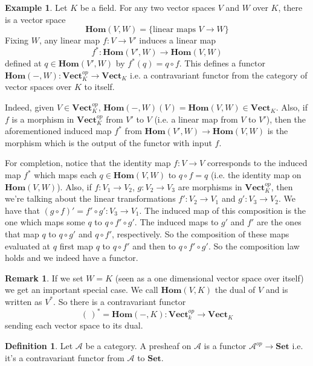 \documentclass{article}
\theoremstyle{definition}
\newtheorem{definition}[theorem]{Definition}
\newtheorem{remark}[theorem]{Remark}
\newtheorem{example}[theorem]{Example}
\newcommand{\cat}[1]{\mathscr{#1}}
\begin{document}
\begin{example}\label{ex:dual-contravariant}
    Let $K$ be a field. For any two vector spaces $V$ and $W$ over $K$, there is a vector space
    $$ \textbf{Hom}(V, W) = \{\text{linear maps } V \to W \}$$
    Fixing $W$, any linear map $f : V \to V'$ induces a linear map
    $$ f^* : \textbf{Hom}(V', W) \to \textbf{Hom}(V, W)$$
    defined at $q \in \textbf{Hom}(V', W)$ by $f^*(q) = q \circ f$.
    This defines a functor $\textbf{Hom}(-, W) : \textbf{Vect}^{op}_K \to \textbf{Vect}_K$ i.e. a contravariant functor from the category of vector spaces over $K$ to itself.

    Indeed, given $V \in \textbf{Vect}^{op}_K$, $\textbf{Hom}(-, W)(V) = \textbf{Hom}(V, W) \in \textbf{Vect}_K$. Also, if $f$ is a morphism in $\textbf{Vect}^{op}_K$ from $V'$ to $V$ (i.e. a linear map from $V$ to $V'$), then the aforementioned induced map $f^{*}$ from $\textbf{Hom}(V', W) \to \textbf{Hom}(V, W)$ is the morphism which is the output of the functor with input $f$.

    For completion, notice that the identity map $f : V \to V$ corresponds to the induced map $f^*$ which maps each $q \in \textbf{Hom}(V, W)$ to $q \circ f = q$ (i.e. the identity map on $\textbf{Hom}(V, W)$). Also, if $f : V_1 \to V_2$, $g : V_2 \to V_3$ are morphisms in $\textbf{Vect}^{op}_K$, then we're talking about the linear transformations $f' : V_2 \to V_1$ and $g' : V_3 \to V_2$.
    We have that $(g \circ f)' = f' \circ g' : V_3 \to V_1$. The induced map of this composition is the one which maps some $q$ to $q \circ f' \circ g'$. The induced maps to $g'$ and $f'$ are the ones that map $q$ to $q \circ g'$ and $q \circ f'$, respectively. So the composition of these maps evaluated at $q$ first map $q$ to $q \circ f'$ and then to $q \circ f' \circ g'$. So the composition law holds and we indeed have a functor.

\end{example}

\begin{remark}\label{rem:dual-contravariant}
    If we set $W=K$ (seen as a one dimensional vector space over itself) we get an important special case. We call $\textbf{Hom}(V, K)$ the dual of $V$ and is written as $V^*$. So there is a contravariant functor
    $$ (\,)^* = \textbf{Hom}(-,K) : \textbf{Vect}_k^{op} \to \textbf{Vect}_K$$
    sending each vector space to its dual.
\end{remark}

\begin{definition}
    Let $\cat{A}$ be a category. A presheaf on $\cat{A}$ is a functor $\cat{A}^{op} \to \textbf{Set}$ i.e. it's a contravariant functor from $\cat{A}$ to $\textbf{Set}$.
\end{definition}
\end{document}
